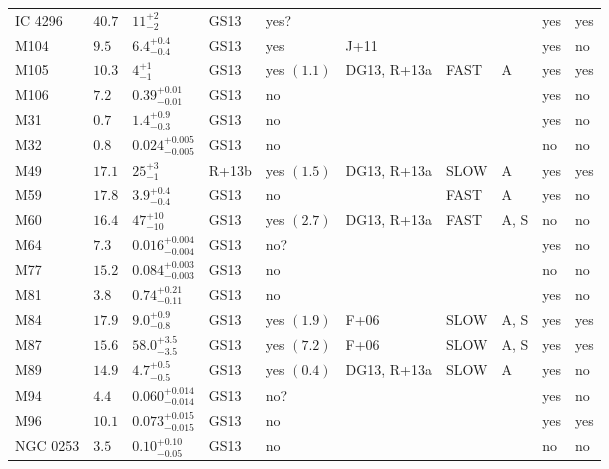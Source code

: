 \begin{table*}
\begin{center}
\begin{tabular}{llllllllll}
IC 4296  &  $40.7$  &  $11_{-2}^{+2}$   &  GS13  &  yes?  &     &      &     &  yes  &  yes  \\ 
M104  &  $9.5$  &  $6.4_{-0.4}^{+0.4}$   &  GS13  &  yes   &  J+11  &      &     &  yes  &  no  \\ 
M105  &  $10.3$  &  $4_{-1}^{+1}$   &  GS13  &  yes  $(1.1)$  &  DG13, R+13a  &  FAST   &  A  &  yes  &  yes  \\ 
M106  &  $7.2$  &  $0.39_{-0.01}^{+0.01}$   &  GS13  &  no   &     &      &     &  yes  &  no  \\ 
M31  &  $0.7$  &  $1.4_{-0.3}^{+0.9}$   &  GS13  &  no   &     &      &     &  yes  &  no  \\ 
M32  &  $0.8$  &  $0.024_{-0.005}^{+0.005}$   &  GS13  &  no   &     &      &     &  no  &  no  \\ 
M49  &  $17.1$  &  $25_{-1}^{+3}$   &  R+13b  &  yes  $(1.5)$  &  DG13, R+13a  &   SLOW  &  A  &  yes  &  yes  \\ 
M59  &  $17.8$  &  $3.9_{-0.4}^{+0.4}$   &  GS13  &  no   &     &  FAST   &  A  &  yes  &  no  \\ 
M60  &  $16.4$  &  $47_{-10}^{+10}$   &  GS13  &  yes  $(2.7)$  &  DG13, R+13a  &  FAST   &  A, S  &  no  &  no  \\ 
M64  &  $7.3$  &  $0.016_{-0.004}^{+0.004}$   &  GS13  &  no?  &     &      &     &  yes  &  no  \\ 
M77  &  $15.2$  &  $0.084_{-0.003}^{+0.003}$   &  GS13  &  no   &     &      &     &  no  &  no  \\ 
M81  &  $3.8$  &  $0.74_{-0.11}^{+0.21}$   &  GS13  &  no   &     &      &     &  yes  &  no  \\ 
M84  &  $17.9$  &  $9.0_{-0.8}^{+0.9}$   &  GS13  &  yes  $(1.9)$  &  F+06  &   SLOW  &  A, S  &  yes  &  yes  \\ 
M87  &  $15.6$  &  $58.0_{-3.5}^{+3.5}$   &  GS13  &  yes  $(7.2)$  &  F+06  &   SLOW  &  A, S  &  yes  &  yes  \\ 
M89  &  $14.9$  &  $4.7_{-0.5}^{+0.5}$   &  GS13  &  yes  $(0.4)$  &  DG13, R+13a  &   SLOW  &  A  &  yes  &  no  \\ 
M94  &  $4.4$  &  $0.060_{-0.014}^{+0.014}$   &  GS13  &  no?  &     &      &     &  yes  &  no  \\ 
M96  &  $10.1$  &  $0.073_{-0.015}^{+0.015}$   &  GS13  &  no   &     &      &     &  yes  &  yes  \\ 
NGC 0253  &  $3.5$  &  $0.10_{-0.05}^{+0.10}$   &  GS13  &  no   &     &      &     &  no  &  no  \\ 

\end{tabular}
\end{center}
\end{table*}
